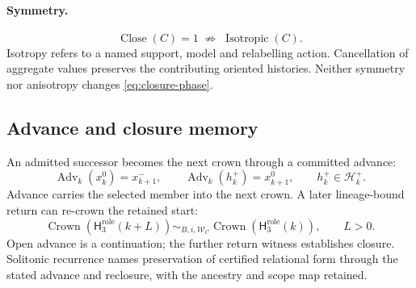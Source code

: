 \paragraph{Symmetry.}
\begin{equation}
\operatorname{Close}(C)=1\;\not\Rightarrow\;\operatorname{Isotropic}(C).
\label{eq:closure-not-isotropy}
\end{equation}
Isotropy refers to a named support, model and relabelling action. Cancellation
of aggregate values preserves the contributing oriented histories. Neither
symmetry nor anisotropy changes \eqref{eq:closure-phase}.

\subsection{Advance and closure memory}
\label{subsec:crown}
An admitted successor becomes the next crown through a committed advance:
\begin{equation}
\operatorname{Adv}_k(x_k^0)=x_{k+1}^-,\qquad
\operatorname{Adv}_k(h_k^+)=x_{k+1}^0,\qquad h_k^+\in\mathcal H_k^+.
\label{eq:crown-advance}
\end{equation}
Advance carries the selected member into the next crown. A later
lineage-bound return can re-crown the retained start:
\begin{equation}
\operatorname{Crown}(\mathsf H_3^{\mathrm{role}}(k+L))
\sim_{B,i,\mathcal W_C}\operatorname{Crown}(\mathsf H_3^{\mathrm{role}}(k)),\qquad L>0.
\label{eq:closure-memory}
\end{equation}
Open advance is a continuation; the further return witness establishes closure.
Solitonic recurrence names preservation of certified relational form through
the stated advance and reclosure, with the ancestry and scope map retained.

